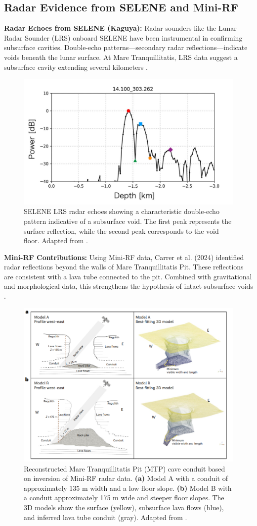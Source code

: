 \subsection{Radar Evidence from SELENE and Mini-RF}

\textbf{Radar Echoes from SELENE (Kaguya):} Radar sounders like the Lunar Radar Sounder (LRS) onboard SELENE have been instrumental in confirming subsurface cavities. Double-echo patterns—secondary radar reflections—indicate voids beneath the lunar surface. At Mare Tranquillitatis, LRS data suggest a subsurface cavity extending several kilometers \citep{cavities-selene-lavatubes}.

\begin{figure}[H]
    \centering
    \includegraphics[width=0.35\linewidth]{selene-doublebump.png}
    \caption{SELENE LRS radar echoes showing a characteristic double-echo pattern indicative of a subsurface void. The first peak represents the surface reflection, while the second peak corresponds to the void floor. Adapted from \citep{cavities-selene-lavatubes}.}
    \label{fig:radar-echoes}
\end{figure}

\textbf{Mini-RF Contributions:} Using Mini-RF data, Carrer et al. (2024) identified radar reflections beyond the walls of Mare Tranquillitatis Pit. These reflections are consistent with a lava tube connected to the pit. Combined with gravitational and morphological data, this strengthens the hypothesis of intact subsurface voids \citep{Carrer2024}.

\begin{figure}[H]
    \centering
    \includegraphics[width=0.85\linewidth]{carrer-renders.png}
    \caption{Reconstructed Mare Tranquillitatis Pit (MTP) cave conduit based on inversion of Mini-RF radar data. \textbf{(a)} Model A with a conduit of approximately 135 m width and a low floor slope. \textbf{(b)} Model B with a conduit approximately 175 m wide and steeper floor slopes. The 3D models show the surface (yellow), subsurface lava flows (blue), and inferred lava tube conduit (gray). Adapted from \citep{Carrer2024}.}
    \label{fig:mtp-cave-conduit}
\end{figure}

